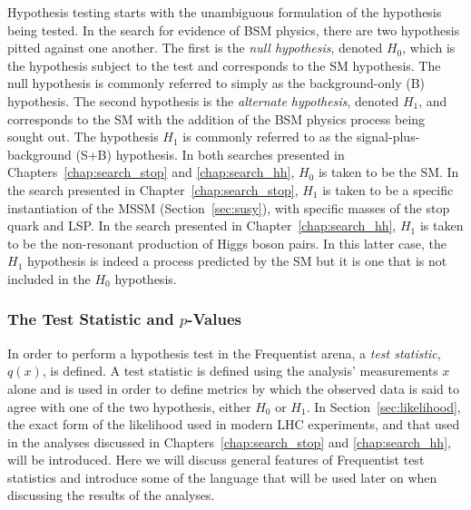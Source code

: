 Hypothesis testing starts with the unambiguous formulation of the hypothesis being
tested.
In the search for evidence of BSM physics, there are two hypothesis pitted
against one another.
The first is the \textit{null hypothesis}, denoted $H_0$, which is the hypothesis
subject to the test and corresponds to the SM hypothesis. The null hypothesis is commonly
referred to simply as the background-only (B) hypothesis.
The second hypothesis is the \textit{alternate hypothesis}, denoted $H_1$, and corresponds
to the SM with the addition of the BSM physics process being sought out.
The hypothesis $H_1$ is commonly referred to as the signal-plus-background (S+B) hypothesis.
In both searches presented in Chapters~\ref{chap:search_stop} and \ref{chap:search_hh},
$H_0$ is taken to be the SM.
In the search presented in Chapter~\ref{chap:search_stop}, $H_1$ is taken to be a specific
instantiation of the MSSM (Section~\ref{sec:susy}), with specific masses of the
stop quark and LSP.
In the search presented in Chapter~\ref{chap:search_hh}, $H_1$ is taken to be the
non-resonant production of Higgs boson pairs.
In this latter case, the $H_1$ hypothesis is indeed a process predicted by the SM but
it is one that is not included in the $H_0$ hypothesis.

%
%
\subsubsection{The Test Statistic and $p$-Values}

In order to perform a hypothesis test in the Frequentist arena, a \textit{test statistic}, $q(x)$,
is defined.
A test statistic is defined using the analysis' measurements $x$ alone and is
used in order to define metrics by which the observed data is said to agree with
one of the two hypothesis, either $H_0$ or $H_1$.
In Section~\ref{sec:likelihood}, the exact form of the likelihood used in modern LHC experiments,
and that used in the analyses discussed in Chapters~\ref{chap:search_stop} and \ref{chap:search_hh},
will be introduced.
Here we will discuss general features of Frequentist test statistics and introduce
some of the language that will be used later on when discussing the results of the
analyses.

